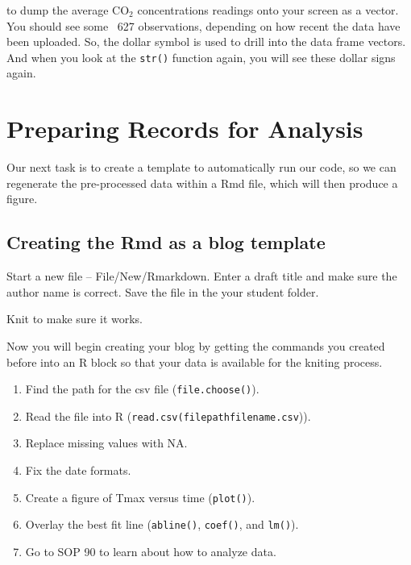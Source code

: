 \documentclass{article}\usepackage[]{graphicx}\usepackage[]{color}
\begin{document}



to dump the average CO$_2$ concentrations readings onto your screen as a vector. You should see some ~627 observations, depending on how recent the data have been uploaded. So, the dollar symbol is used to drill into the data frame vectors.  And when you look at the \texttt{str()} function again, you will see these dollar signs again.

\section{Preparing Records for Analysis}

Our next task is to create a template to automatically run our code, so we can regenerate the pre-processed data within a Rmd file, which will then produce a figure. 

\subsection{Creating the Rmd as a blog template}

Start a new file -- File/New/Rmarkdown. Enter a draft title and make sure the author name is correct. Save the file in the your student folder. 

Knit to make sure it works. 

Now you will begin creating your blog by getting the commands you created before into an R block so that your data is available for the kniting process.

\begin{enumerate}
  \item Find the path for the csv file (\texttt{file.choose()}).
  \item Read the file into R (\texttt{read.csv(filepathfilename.csv})).
  \item Replace missing values with NA.
  \item Fix the date formats.
  \item Create a figure of Tmax versus time (\texttt{plot()}).
  \item Overlay the best fit line (\texttt{abline()}, \texttt{coef()}, and \texttt{lm()}).
  \item Go to SOP 90 to learn about how to analyze data.
  
\end{enumerate}
\end{document}
